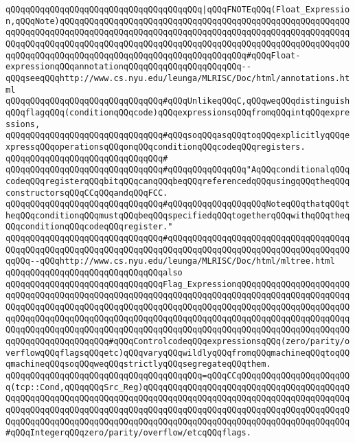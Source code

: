 \verb|qQQqqQQqqQQqqQQqqQQqqQQqqQQqqQQqqQQqqQQq|\verb#|qQQqFNOTEqQQq(Float_Expression,qQQqNote)qQQqqQQqqQQqqQQqqQQqqQQqqQQqqQQqqQQqqQQqqQQqqQQqqQQqqQQqqQQqqQQqqQQqqQQqqQQqqQQqqQQqqQQqqQQqqQQqqQQqqQQqqQQqqQQqqQQqqQQqqQQqqQQqqQQqqQQqqQQqqQQqqQQqqQQqqQQqqQQqqQQqqQQqqQQqqQQqqQQqqQQqqQQqqQQqqQQqqQQqqQQqqQQqqQQqqQQqqQQqqQQqqQQqqQQqqQQqqQQqqQQqqQQq#\verb|#qQQqFloat-expressionqQQqannotationqQQqqQQqqQQqqQQqqQQqqQQq--qQQqseeqQQqhttp://www.cs.nyu.edu/leunga/MLRISC/Doc/html/annotations.html|\newline
\newline
\newline
\verb|qQQqqQQqqQQqqQQqqQQqqQQqqQQqqQQq#qQQqUnlikeqQQqC,qQQqweqQQqdistinguishqQQqflagqQQq(conditionqQQqcode)qQQqexpressionsqQQqfromqQQqintqQQqexpressions,|\newline
\verb|qQQqqQQqqQQqqQQqqQQqqQQqqQQqqQQq#qQQqsoqQQqasqQQqtoqQQqexplicitlyqQQqexpressqQQqoperationsqQQqonqQQqconditionqQQqcodeqQQqregisters.|\newline
\verb|qQQqqQQqqQQqqQQqqQQqqQQqqQQqqQQq#|\newline
\verb|qQQqqQQqqQQqqQQqqQQqqQQqqQQqqQQq#qQQqqQQqqQQqqQQq"AqQQqconditionalqQQqcodeqQQqregisterqQQqbitqQQqcanqQQqbeqQQqreferencedqQQqusingqQQqtheqQQqconstructorsqQQqCCqQQqandqQQqFCC.|\newline
\verb|qQQqqQQqqQQqqQQqqQQqqQQqqQQqqQQq#qQQqqQQqqQQqqQQqqQQqNoteqQQqthatqQQqtheqQQqconditionqQQqmustqQQqbeqQQqspecifiedqQQqtogetherqQQqwithqQQqtheqQQqconditionqQQqcodeqQQqregister."|\newline
\verb|qQQqqQQqqQQqqQQqqQQqqQQqqQQqqQQq#qQQqqQQqqQQqqQQqqQQqqQQqqQQqqQQqqQQqqQQqqQQqqQQqqQQqqQQqqQQqqQQqqQQqqQQqqQQqqQQqqQQqqQQqqQQqqQQqqQQqqQQqqQQqqQQq--qQQqhttp://www.cs.nyu.edu/leunga/MLRISC/Doc/html/mltree.html|\newline
\verb|qQQqqQQqqQQqqQQqqQQqqQQqqQQqqQQqalso|\newline
\verb|qQQqqQQqqQQqqQQqqQQqqQQqqQQqqQQqFlag_ExpressionqQQqqQQqqQQqqQQqqQQqqQQqqQQqqQQqqQQqqQQqqQQqqQQqqQQqqQQqqQQqqQQqqQQqqQQqqQQqqQQqqQQqqQQqqQQqqQQqqQQqqQQqqQQqqQQqqQQqqQQqqQQqqQQqqQQqqQQqqQQqqQQqqQQqqQQqqQQqqQQqqQQqqQQqqQQqqQQqqQQqqQQqqQQqqQQqqQQqqQQqqQQqqQQqqQQqqQQqqQQqqQQqqQQqqQQqqQQqqQQqqQQqqQQqqQQqqQQqqQQqqQQqqQQqqQQqqQQqqQQqqQQqqQQqqQQqqQQqqQQqqQQqqQQqqQQqqQQqqQQqqQQq#qQQqControlcodeqQQqexpressionsqQQq(zero/parity/overflowqQQqflagsqQQqetc)qQQqvaryqQQqwildlyqQQqfromqQQqmachineqQQqtoqQQqmachineqQQqsoqQQqweqQQqstrictlyqQQqsegregateqQQqthem.|\newline
\verb|qQQqqQQqqQQqqQQqqQQqqQQqqQQqqQQqqQQqqQQq=qQQqCCqQQqqQQqqQQqqQQqqQQqqQQq(tcp::Cond,qQQqqQQqSrc_Reg)qQQqqQQqqQQqqQQqqQQqqQQqqQQqqQQqqQQqqQQqqQQqqQQqqQQqqQQqqQQqqQQqqQQqqQQqqQQqqQQqqQQqqQQqqQQqqQQqqQQqqQQqqQQqqQQqqQQqqQQqqQQqqQQqqQQqqQQqqQQqqQQqqQQqqQQqqQQqqQQqqQQqqQQqqQQqqQQqqQQqqQQqqQQqqQQqqQQqqQQqqQQqqQQqqQQqqQQqqQQqqQQqqQQqqQQqqQQqqQQqqQQqqQQqqQQq#qQQqIntegerqQQqzero/parity/overflow/etcqQQqflags.|\newline
